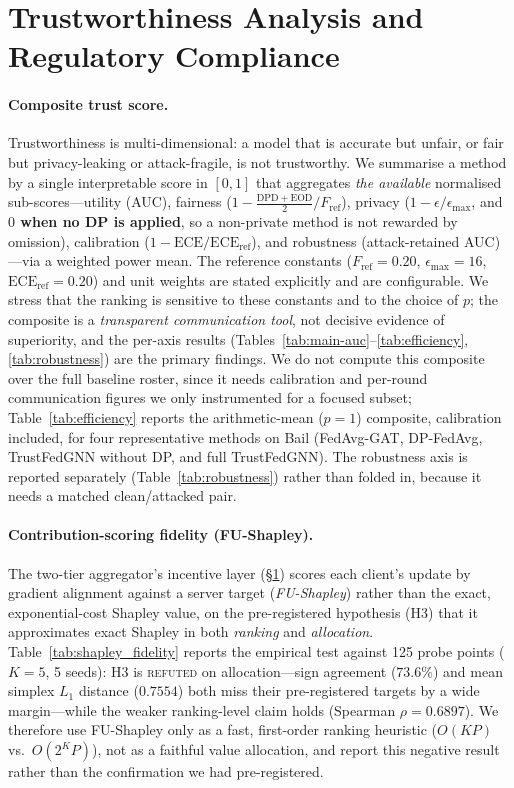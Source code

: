 \documentclass[pdflatex,sn-mathphys-num]{sn-jnl}
\theoremstyle{thmstyleone}%
\theoremstyle{thmstyletwo}%
\theoremstyle{thmstylethree}%
\newcommand{\dpd}{\mathrm{DPD}}
\newcommand{\eod}{\mathrm{EOD}}
\begin{document}


\section{Trustworthiness Analysis and Regulatory Compliance}
\label{sec:trust}

\paragraph{Composite trust score.}
Trustworthiness is multi-dimensional: a model that is accurate but unfair, or
fair but privacy-leaking or attack-fragile, is not trustworthy. We summarise a
method by a single interpretable score in $[0,1]$ that aggregates \emph{the
available} normalised sub-scores---utility (AUC), fairness
($1-\tfrac{\dpd+\eod}{2}/F_{\text{ref}}$), privacy ($1-\epsilon/\epsilon_{\max}$,
and \textbf{$0$ when no DP is applied}, so a non-private method is not rewarded
by omission), calibration ($1-\mathrm{ECE}/\mathrm{ECE}_{\text{ref}}$), and
robustness (attack-retained AUC)---via a weighted power mean. The reference
constants ($F_{\text{ref}}{=}0.20$, $\epsilon_{\max}{=}16$,
$\mathrm{ECE}_{\text{ref}}{=}0.20$) and unit weights are stated explicitly and
are configurable. We stress that the ranking is sensitive to these constants and
to the choice of $p$; the composite is a \emph{transparent communication tool},
not decisive evidence of superiority, and the per-axis results
(Tables~\ref{tab:main-auc}--\ref{tab:efficiency}, \ref{tab:robustness}) are the
primary findings. We do not compute this composite over the full baseline
roster, since it needs calibration and per-round communication figures we only
instrumented for a focused subset; Table~\ref{tab:efficiency} reports the
arithmetic-mean ($p{=}1$) composite, calibration included, for four
representative methods on Bail (FedAvg-GAT, DP-FedAvg, TrustFedGNN without DP,
and full TrustFedGNN). The robustness axis is reported separately
(Table~\ref{tab:robustness}) rather than folded in, because it needs a matched
clean/attacked pair.

\paragraph{Contribution-scoring fidelity (FU-Shapley).}
The two-tier aggregator's incentive layer (\S\ref{sec:trust}) scores each
client's update by gradient alignment against a server target
(\emph{FU-Shapley}) rather than the exact, exponential-cost Shapley value, on
the pre-registered hypothesis (H3) that it approximates exact Shapley in both
\emph{ranking} and \emph{allocation}. Table~\ref{tab:shapley_fidelity} reports
the empirical test against 125 probe points ($K{=}5$, 5 seeds): H3 is
\textsc{refuted} on allocation---sign agreement ($73.6\%$) and mean simplex
$L_1$ distance ($0.7554$) both miss their pre-registered targets by a wide
margin---while the weaker ranking-level claim holds (Spearman
$\rho{=}0.6897$). We therefore use FU-Shapley only as a fast, first-order
ranking heuristic ($O(KP)$ vs.\ $O(2^KP)$), not as a faithful value allocation,
and report this negative result rather than the confirmation we had
pre-registered.
\end{document}
